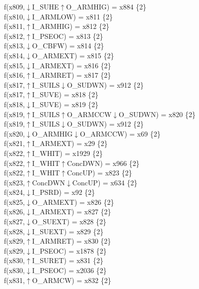 f(x809,$\downarrow$I\_SUHE$\uparrow$O\_ARMHIG) = x884 \{2\} \\  
f(x810,$\downarrow$I\_ARMLOW) = x811 \{2\} \\  
f(x811,$\uparrow$I\_ARMHIG) = x812 \{2\} \\  
f(x812,$\uparrow$I\_PSEOC) = x813 \{2\} \\  
f(x813,$\downarrow$O\_CBFW) = x814 \{2\} \\  
f(x814,$\downarrow$O\_ARMEXT) = x815 \{2\} \\  
f(x815,$\downarrow$I\_ARMEXT) = x816 \{2\} \\  
f(x816,$\uparrow$I\_ARMRET) = x817 \{2\} \\  
f(x817,$\uparrow$I\_SUILS$\downarrow$O\_SUDWN) = x912 \{2\} \\  
f(x817,$\uparrow$I\_SUVE) = x818 \{2\} \\  
f(x818,$\downarrow$I\_SUVE) = x819 \{2\} \\  
f(x819,$\uparrow$I\_SUILS$\uparrow$O\_ARMCCW$\downarrow$O\_SUDWN) = x820 \{2\} \\  
f(x819,$\uparrow$I\_SUILS$\downarrow$O\_SUDWN) = x912 \{2\} \\  
f(x820,$\downarrow$O\_ARMHIG$\downarrow$O\_ARMCCW) = x69 \{2\} \\  
f(x821,$\uparrow$I\_ARMEXT) = x29 \{2\} \\  
f(x822,$\uparrow$I\_WHIT) = x1929 \{2\} \\  
f(x822,$\uparrow$I\_WHIT$\uparrow$ConcDWN) = x966 \{2\} \\  
f(x822,$\uparrow$I\_WHIT$\uparrow$ConcUP) = x823 \{2\} \\  
f(x823,$\uparrow$ConcDWN$\downarrow$ConcUP) = x634 \{2\} \\  
f(x824,$\downarrow$I\_PSRD) = x92 \{2\} \\  
f(x825,$\downarrow$O\_ARMEXT) = x826 \{2\} \\  
f(x826,$\downarrow$I\_ARMEXT) = x827 \{2\} \\  
f(x827,$\downarrow$O\_SUEXT) = x828 \{2\} \\  
f(x828,$\downarrow$I\_SUEXT) = x829 \{2\} \\  
f(x829,$\uparrow$I\_ARMRET) = x830 \{2\} \\  
f(x829,$\downarrow$I\_PSEOC) = x1878 \{2\} \\  
f(x830,$\uparrow$I\_SURET) = x831 \{2\} \\  
f(x830,$\downarrow$I\_PSEOC) = x2036 \{2\} \\  
f(x831,$\uparrow$O\_ARMCW) = x832 \{2\} \\  
